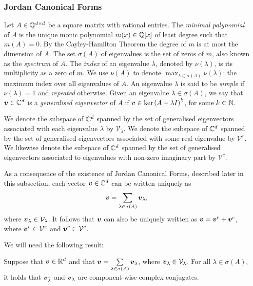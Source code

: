 \subsubsection{Jordan Canonical Forms}
\label{sec:jordan}

Let $A \in \mathbb{Q}^{d \times d}$ be a square matrix with rational
entries.
The \emph{minimal polynomial} of $A$ is the unique monic
polynomial $m(x) \in \mathbb{Q}[x]$ of least degree such that
$m(A)=0$.  By the Cayley-Hamilton Theorem the degree of $m$ is at most
the dimension of $A$. The set $\sigma(A)$ of eigenvalues is the set of
zeros of $m$, also known as the \emph{spectrum} of $A$.
The \emph{index} of an eigenvalue $\lambda$, denoted
by $\nu(\lambda)$, is its multiplicity as a zero of $m$. We
use $\nu(A)$ to denote $\max_{\lambda\in\sigma(A)} \nu(\lambda)$: the
maximum index over all eigenvalues of $A$. An eigenvalue $\lambda$ is said to be \emph{simple} if $\nu(\lambda) = 1$ and \emph{repeated} otherwise.
Given an eigenvalue $\lambda \in \sigma(A)$, we say that $\boldsymbol{v} \in \mathbb{C}^{d}$ is a \emph{generalised eigenvector} of $A$ if $\boldsymbol{v}\in \ker{(A-\lambda I)}^{k}$, for some $k\in\mathbb{N}$.

We denote the subspace of $\mathbb{C}^{d}$ spanned by the set of
generalised eigenvectors associated with each eigenvalue $\lambda$ by
$\mathcal{V}_{\lambda}$. We denote the subspace of $\mathbb{C}^{d}$
spanned by the set of generalised eigenvectors associated with some
real eigenvalue by $\mathcal{V}^{r}$.  We likewise denote the subspace
of $\mathbb{C}^{d}$ spanned by the set of generalised eigenvectors
associated to eigenvalues with non-zero imaginary part by
$\mathcal{V}^{c}$.

As a consequence of the existence of Jordan Canonical Forms, described later in this subsection, each vector $\boldsymbol{v}\in\mathbb{C}^{d}$
can be written uniquely as
\begin{equation}
\label{eq:eigen-decomposition}
\myvector{v}=\displaystyle{
  \sum\limits_{\lambda\in\sigma(A)}\myvector{v}_{\lambda}},
\end{equation}
where $\boldsymbol{v}_{\lambda}\in\mathcal{V}_{\lambda}$.
It follows that $\boldsymbol{v}$ can also be uniquely written as
$\boldsymbol{v}=\boldsymbol{v}^{r}+\boldsymbol{v}^{c}$, where
$\boldsymbol{v}^{r} \in\mathcal{V}^{r}$ and
$\boldsymbol{v}^{c} \in\mathcal{V}^{c}$.

We will need the following result:
\begin{proposition}
\label{conj-relation}
  Suppose that $\boldsymbol{v}\in\mathbb{R}^{d}$ and that $\boldsymbol{v}=\sum\limits_{\lambda\in\sigma(A)} \boldsymbol{v}_{\lambda}$, where $\boldsymbol{v}_{\lambda} \in\mathcal{V}_{\lambda}$. For all $\lambda \in \sigma(A)$, it holds that $\boldsymbol{v}_{\overline{\lambda}}$ and $\boldsymbol{v}_{\lambda}$ are component-wise complex conjugates.
\end{proposition}

